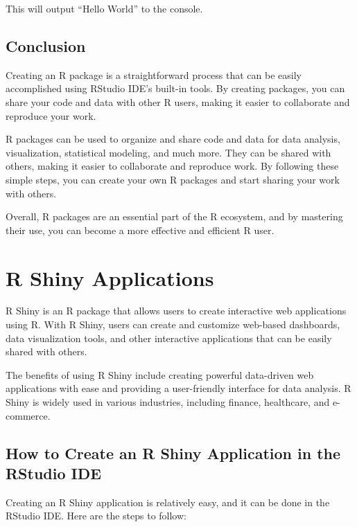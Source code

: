 \documentclass[
]{book}
\begin{document}
This will output ``Hello World'' to the console.

\hypertarget{conclusion-1}{%
\subsection{Conclusion}\label{conclusion-1}}

Creating an R package is a straightforward process that can be easily accomplished using RStudio IDE's built-in tools. By creating packages, you can share your code and data with other R users, making it easier to collaborate and reproduce your work.

R packages can be used to organize and share code and data for data analysis, visualization, statistical modeling, and much more. They can be shared with others, making it easier to collaborate and reproduce work. By following these simple steps, you can create your own R packages and start sharing your work with others.

Overall, R packages are an essential part of the R ecosystem, and by mastering their use, you can become a more effective and efficient R user.

\hypertarget{r-shiny-applications}{%
\section{R Shiny Applications}\label{r-shiny-applications}}

R Shiny is an R package that allows users to create interactive web applications using R. With R Shiny, users can create and customize web-based dashboards, data visualization tools, and other interactive applications that can be easily shared with others.

The benefits of using R Shiny include creating powerful data-driven web applications with ease and providing a user-friendly interface for data analysis. R Shiny is widely used in various industries, including finance, healthcare, and e-commerce.

\hypertarget{how-to-create-an-r-shiny-application-in-the-rstudio-ide}{%
\subsection{How to Create an R Shiny Application in the RStudio IDE}\label{how-to-create-an-r-shiny-application-in-the-rstudio-ide}}

Creating an R Shiny application is relatively easy, and it can be done in the RStudio IDE. Here are the steps to follow:
\end{document}
